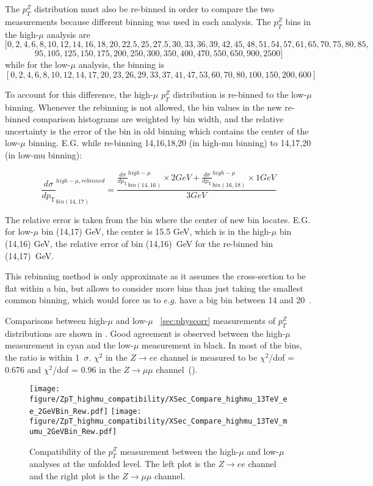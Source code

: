 The $p_{T}^{Z}$ distribution must also be re-binned in order to compare the two measurements because different binning was used in each analysis.
The $p_{T}^{Z}$ bins in the high-$\mu$ analysis are
$$[0, 2, 4, 6, 8, 10, 12, 14, 16, 18, 20, 22.5, 25, 27.5, 30, 33, 36, 39, 42, 45, 48, 51, 54, 57, 61, 65, 70, 75, 80, 85,$$
$$95, 105, 125, 150, 175, 200, 250, 300, 350, 400, 470, 550, 650, 900, 2500]$$
while for the low-$\mu$ analysis, the binning is
$$[0, 2, 4, 6, 8, 10, 12, 14, 17, 20, 23, 26, 29, 33, 37, 41, 47, 53, 60, 70, 80, 100, 150, 200, 600]$$

To account for this difference, the high-$\mu$ $p_{T}^{Z}$ distribution is re-binned to the low-$\mu$ binning.
Whenever the rebinning is not allowed, the bin values in the new re-binned comparison histograms are weighted by bin width,
and the relative uncertainty is the error of the bin in old binning which contains the center of the low-$\mu$ binning.
E.G. while re-binning 14,16,18,20 (in high-mu binning)  to  14,17,20 (in low-mu binning):

$$\frac{d\sigma}{dp_\mathrm{T}}_{bin (14,17)}^{high-\mu, rebinned} = \frac{ \frac{d\sigma}{dp_\mathrm{T}}_{bin(14,16)}^{high-\mu} \times 2GeV + \frac{d\sigma}{dp_\mathrm{T}}_{bin(16,18)}^{high-\mu} \times 1GeV }{3GeV}$$

The relative error is taken from the bin where the center of new bin locates. E.G. for low-$\mu$ bin (14,17) GeV, the center is 15.5 GeV, which is in the high-$\mu$ bin (14,16) GeV, the relative error of bin (14,16)~GeV for the re-binned bin (14,17)~GeV.

This rebinning method is only approximate as it assumes the cross-section to be flat within a bin, but allows to consider more bins than just taking the smallest common binning, which would force us to $e.g.$ have a big bin between 14 and 20~\GeV.

Comparisons between high-$\mu$ and low-$\mu$ ~\ref{sec:physcorr} measurements of $p_{T}^{Z}$ distributions are shown in \Fig{\ref{f:CompatibilityHighLowMuRew}}. Good agreement is observed between the high-$\mu$ measurement in cyan and the low-$\mu$ measurement in black. In most of the bins, the ratio is within 1~$\sigma$.
$\chi^2$ in the $Z\rightarrow ee$ channel is measured to be $\chi^2$/dof =  0.676 and $\chi^2$/dof = 0.96 in the $Z\rightarrow \mu\mu$ channel~(\Tab{\ref{tab:chi2highmuRew}}).

\begin{figure}[h]
  \centering
  \texttt{[image: figure/ZpT\_highmu\_compatibility/XSec\_Compare\_highmu\_13TeV\_ee\_2GeVBin\_Rew.pdf]}
   \texttt{[image: figure/ZpT\_highmu\_compatibility/XSec\_Compare\_highmu\_13TeV\_mumu\_2GeVBin\_Rew.pdf]}
  \caption{Compatibility of the $p_{T}^{Z}$ measurement between the high-$\mu$ and low-$\mu$ analyses at the unfolded level. The left plot is the $Z\rightarrow ee$ channel and the right plot is the $Z\rightarrow \mu\mu$ channel.}
    \label{f:CompatibilityHighLowMuRew}
\end{figure}

